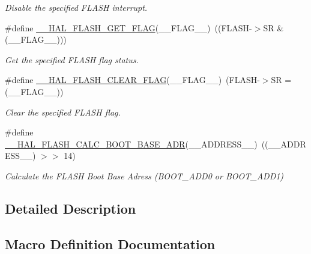 \begin{DoxyCompactItemize}
\begin{DoxyCompactList}\small\item\em Disable the specified F\+L\+A\+SH interrupt. \end{DoxyCompactList}\item 
\#define \mbox{\hyperlink{group___f_l_a_s_h___exported___macros_ga0d3dd161fecc0e47c9e109c7c28672c1}{\+\_\+\+\_\+\+H\+A\+L\+\_\+\+F\+L\+A\+S\+H\+\_\+\+G\+E\+T\+\_\+\+F\+L\+AG}}(\+\_\+\+\_\+\+F\+L\+A\+G\+\_\+\+\_\+)~((F\+L\+A\+SH-\/$>$SR \& (\+\_\+\+\_\+\+F\+L\+A\+G\+\_\+\+\_\+)))
\begin{DoxyCompactList}\small\item\em Get the specified F\+L\+A\+SH flag status. \end{DoxyCompactList}\item 
\#define \mbox{\hyperlink{group___f_l_a_s_h___exported___macros_ga68e49c4675761e2ec35153e747de7622}{\+\_\+\+\_\+\+H\+A\+L\+\_\+\+F\+L\+A\+S\+H\+\_\+\+C\+L\+E\+A\+R\+\_\+\+F\+L\+AG}}(\+\_\+\+\_\+\+F\+L\+A\+G\+\_\+\+\_\+)~(F\+L\+A\+SH-\/$>$SR = (\+\_\+\+\_\+\+F\+L\+A\+G\+\_\+\+\_\+))
\begin{DoxyCompactList}\small\item\em Clear the specified F\+L\+A\+SH flag. \end{DoxyCompactList}\item 
\#define \mbox{\hyperlink{group___f_l_a_s_h___exported___macros_gab7c736ccacb9f3eb5dd1f0c4d79e9a33}{\+\_\+\+\_\+\+H\+A\+L\+\_\+\+F\+L\+A\+S\+H\+\_\+\+C\+A\+L\+C\+\_\+\+B\+O\+O\+T\+\_\+\+B\+A\+S\+E\+\_\+\+A\+DR}}(\+\_\+\+\_\+\+A\+D\+D\+R\+E\+S\+S\+\_\+\+\_\+)~((\+\_\+\+\_\+\+A\+D\+D\+R\+E\+S\+S\+\_\+\+\_\+) $>$$>$ 14)
\begin{DoxyCompactList}\small\item\em Calculate the F\+L\+A\+SH Boot Base Adress (B\+O\+O\+T\+\_\+\+A\+D\+D0 or B\+O\+O\+T\+\_\+\+A\+D\+D1) \end{DoxyCompactList}\end{DoxyCompactItemize}


\subsection{Detailed Description}


\subsection{Macro Definition Documentation}
\mbox{\label{group___f_l_a_s_h___exported___macros_ga2bad63029bd87a1e17d8147f38334630}} 
